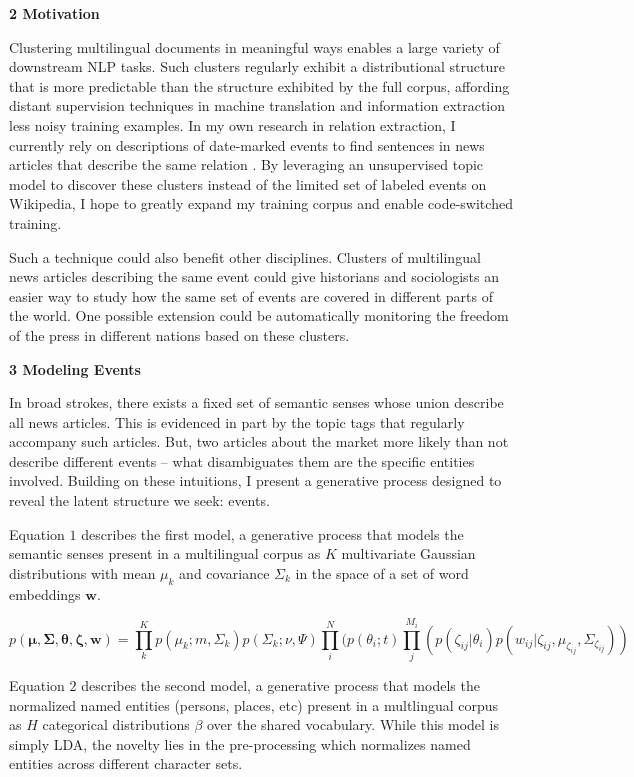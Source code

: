 \documentclass[12pt]{article}
\begin{document}
\textbf{2 Motivation}

Clustering multilingual documents in meaningful ways enables a large variety of downstream NLP tasks.  Such clusters regularly exhibit a distributional structure that is more predictable than the structure exhibited by the full corpus, affording distant supervision techniques in machine translation and information extraction less noisy training examples.  In my own research in relation extraction, I currently rely on descriptions of date-marked events to find sentences in news articles that describe the same relation \cite{ananthram2020event}.  By leveraging an unsupervised topic model to discover these clusters instead of the limited set of labeled events on Wikipedia, I hope to greatly expand my training corpus and enable code-switched training.

Such a technique could also benefit other disciplines.  Clusters of multilingual news articles describing the same event could give historians and sociologists an easier way to study how the same set of events are covered in different parts of the world.   One possible extension could be automatically monitoring the freedom of the press in different nations based on these clusters.

\textbf{3 Modeling Events}

In broad strokes, there exists a fixed set of semantic senses whose union describe all news articles.  This is evidenced in part by the topic tags that regularly accompany such articles.  But, two articles about the market more likely than not describe different events -- what disambiguates them are the specific entities involved.  Building on these intuitions, I present a generative process designed to reveal the latent structure we seek: events.

Equation $1$ describes the first model, a generative process that models the semantic senses present in a multilingual corpus as $K$ multivariate Gaussian distributions with mean $\mu_k$ and covariance $\Sigma_k$ in the space of a set of word embeddings $\bm{w}$. 

\begin{equation}
p(\bm{\mu}, \bm{\Sigma}, \bm{\theta}, \bm{\zeta}, \bm{w}) = \prod^{K}_{k} p(\mu_k; m, \Sigma_k)p(\Sigma_k; \nu, \Psi)\prod^N_{i}(p(\theta_i; t)\prod^{M_i}_{j}(p(\zeta_{ij} | \theta_i)p(w_{ij} | \zeta_{ij}, \mu_{\zeta_{ij}}, \Sigma_{\zeta_{ij}}))
\end{equation}

Equation $2$ describes the second model, a generative process that models the normalized named entities (persons, places, etc) present in a multlingual corpus as $H$ categorical distributions $\beta$ over the shared vocabulary.  While this model is simply LDA, the novelty lies in the pre-processing which normalizes named entities across different character sets.
\end{document}

